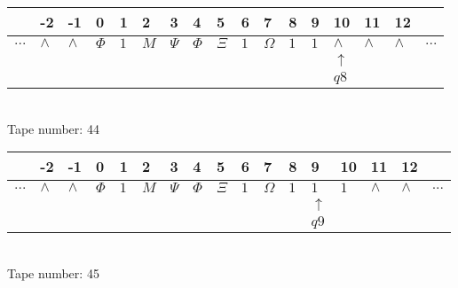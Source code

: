 \documentclass{article}
\begin{document}
\begin{table}[H]
\centering
\begin{tabular}{lllllllllllllllll}
 & -2 & -1 & 0 & 1 & 2 & 3 & 4 & 5 & 6 & 7 & 8 & 9 & 10 & 11 & 12 & \\
\hline
$...$ & \multicolumn{1}{|l|}{$\wedge$} & \multicolumn{1}{|l|}{$\wedge$} & \multicolumn{1}{|l|}{$\Phi$} & \multicolumn{1}{|l|}{$1$} & \multicolumn{1}{|l|}{$M$} & \multicolumn{1}{|l|}{$\Psi$} & \multicolumn{1}{|l|}{$\Phi$} & \multicolumn{1}{|l|}{$\Xi$} & \multicolumn{1}{|l|}{$1$} & \multicolumn{1}{|l|}{$\Omega$} & \multicolumn{1}{|l|}{$1$} & \multicolumn{1}{|l|}{$1$} & \multicolumn{1}{|l|}{$\wedge$} & \multicolumn{1}{|l|}{$\wedge$} & \multicolumn{1}{|l|}{$\wedge$} & $...$\\
\hline
&  &  &  &  &  &  &  &  &  &  &  &  & $\uparrow$ &  &  &  \\
&  &  &  &  &  &  &  &  &  &  &  &  & $ q8 $ &  &  &  \\
\end{tabular}
\\
Tape number: 44
\noindent\makebox[\linewidth]{\hdashrule{\textwidth}{1pt}{1pt}}\end{table}

\begin{table}[H]
\centering
\begin{tabular}{lllllllllllllllll}
 & -2 & -1 & 0 & 1 & 2 & 3 & 4 & 5 & 6 & 7 & 8 & 9 & 10 & 11 & 12 & \\
\hline
$...$ & \multicolumn{1}{|l|}{$\wedge$} & \multicolumn{1}{|l|}{$\wedge$} & \multicolumn{1}{|l|}{$\Phi$} & \multicolumn{1}{|l|}{$1$} & \multicolumn{1}{|l|}{$M$} & \multicolumn{1}{|l|}{$\Psi$} & \multicolumn{1}{|l|}{$\Phi$} & \multicolumn{1}{|l|}{$\Xi$} & \multicolumn{1}{|l|}{$1$} & \multicolumn{1}{|l|}{$\Omega$} & \multicolumn{1}{|l|}{$1$} & \multicolumn{1}{|l|}{$1$} & \multicolumn{1}{|l|}{$1$} & \multicolumn{1}{|l|}{$\wedge$} & \multicolumn{1}{|l|}{$\wedge$} & $...$\\
\hline
&  &  &  &  &  &  &  &  &  &  &  & $\uparrow$ &  &  &  &  \\
&  &  &  &  &  &  &  &  &  &  &  & $ q9 $ &  &  &  &  \\
\end{tabular}
\\
Tape number: 45
\noindent\makebox[\linewidth]{\hdashrule{\textwidth}{1pt}{1pt}}\end{table}
\end{document}
